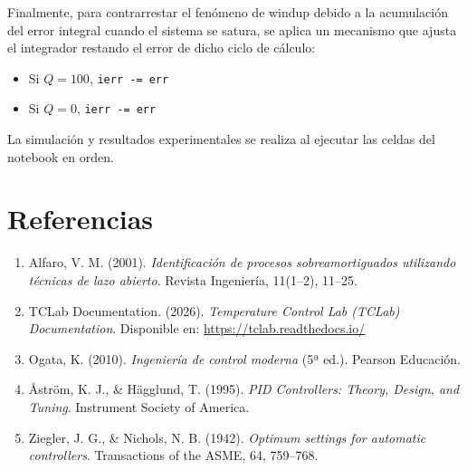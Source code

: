 \documentclass[letterpaper,12pt]{article}
\begin{document}
Finalmente, para contrarrestar el fenómeno de windup debido a la acumulación del error integral cuando el sistema se satura, se aplica un mecanismo que ajusta el integrador restando el error de dicho ciclo de cálculo:
\begin{itemize}
    \item Si $Q = 100$, \texttt{ierr -= err}  
    \item Si $Q = 0$, \texttt{ierr -= err}  
\end{itemize}


La simulación y resultados experimentales se realiza al ejecutar las celdas del notebook en orden.

\section*{Referencias}

\begin{enumerate}
    \item Alfaro, V. M. (2001). \textit{Identificación de procesos sobreamortiguados utilizando técnicas de lazo abierto}. Revista Ingeniería, 11(1--2), 11--25.

    \item TCLab Documentation. (2026). \textit{Temperature Control Lab (TCLab) Documentation}. Disponible en: \url{https://tclab.readthedocs.io/}

    \item Ogata, K. (2010). \textit{Ingeniería de control moderna} (5ª ed.). Pearson Educación.

    \item Åström, K. J., \& Hägglund, T. (1995). \textit{PID Controllers: Theory, Design, and Tuning}. Instrument Society of America.

    \item Ziegler, J. G., \& Nichols, N. B. (1942). \textit{Optimum settings for automatic controllers}. Transactions of the ASME, 64, 759--768.
\end{enumerate}
\end{document}
